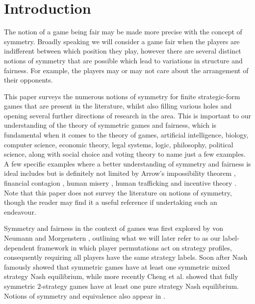 \section{Introduction} \label{sec:intro}
The notion of a game being fair may be made more precise with the concept of symmetry. Broadly speaking we will consider a game fair when the players are indifferent between which position they play, however there are several distinct notions of symmetry that are possible which lead to variations in structure and fairness. For example, the players may or may not care about the arrangement of their opponents. 

This paper surveys the numerous notions of symmetry for finite strategic-form games that are present in the literature, whilst also filling various holes and opening several further directions of research in the area. This is important to our understanding of the theory of symmetric games and fairness, which is fundamental when it comes to the theory of games, artificial intelligence, biology, computer science, economic theory, legal systems, logic, philosophy, political science, along with social choice and voting theory to name just a few examples. A few specific examples where a better understanding of symmetry and fairness is ideal includes but is definitely not limited by Arrow's impossibility theorem \cite{arrow1950difficulty, arrow2012social}, financial contagion \cite{dungey2005contagion}, human misery \cite{margolis2003misery}, human trafficking \cite{aronowitz2009human} and incentive theory \cite{laffont1993theory, laffont2009theory}. Note that this paper does not survey the literature on notions of symmetry, though the reader may find it a useful reference if undertaking such an endeavour. 



Symmetry and fairness in the context of games was first explored by von Neumann and Morgenstern \cite{VNM}, outlining what we will later refer to as our label-dependent framework in which player permutations act on strategy profiles, consequently requiring all players have the same strategy labels. Soon after Nash \cite{NashNCG} famously showed that symmetric games have at least one symmetric mixed strategy Nash equilibrium, while more recently Cheng et al. \cite{CRVWSym} showed that fully symmetric $2$-strategy games have at least one pure strategy Nash equilibrium. Notions of symmetry and equivalence also appear in \cite{HarsanyiSelten}.

